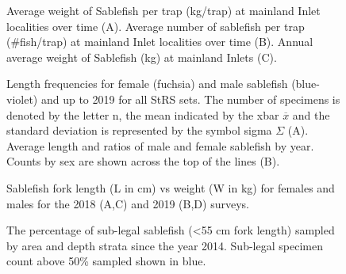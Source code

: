 \documentclass[12pt]{article}\usepackage[]{graphicx}\usepackage[]{color}
\begin{document}
\begin{figure}[htb]

{\centering {} 

}

\caption{Average weight of Sablefish per trap (kg/trap) at mainland Inlet localities over time (A). Average number of sablefish per trap (\#fish/trap) at mainland Inlet localities over time (B). Annual average weight of Sablefish (kg) at mainland Inlets (C).}\label{fig:figure9}
\end{figure}
\clearpage


\begin{figure}[htb]

{\centering {} 

}

\caption{Length frequencies for female (fuchsia) and male sablefish (blue-violet) and up to 2019 for all StRS sets. The number of specimens is denoted by the letter n, the mean indicated by the xbar \(\overline{x}\) and the standard deviation is represented by the symbol sigma \(\Sigma\) (A). Average length and ratios of male and female sablefish by year. Counts by sex are shown across the top of the lines (B).}\label{fig:figure10}
\end{figure}
\clearpage


\begin{figure}[htb]

{\centering {} 

}

\caption{Sablefish fork length (L in cm) vs weight (W in kg) for females and males for the 2018 (A,C) and 2019 (B,D) surveys.}\label{fig:figure11}
\end{figure}
\clearpage


\begin{figure}[htb]

{\centering {} 

}

\caption{The percentage of sub-legal sablefish (\textless55 cm fork length) sampled by area and depth strata since the year 2014. Sub-legal specimen count above 50\% sampled shown in blue.}\label{fig:figure12}
\end{figure}
\clearpage
\end{document}
